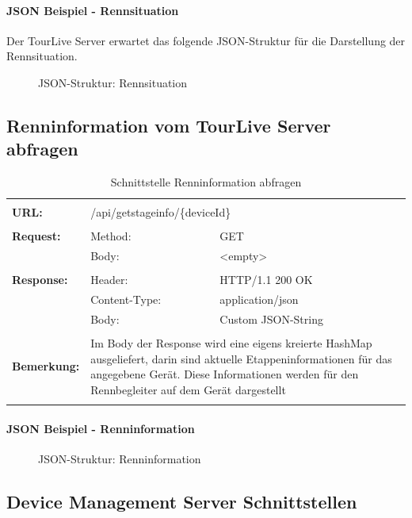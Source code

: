 \paragraph{JSON Beispiel - Rennsituation}
Der TourLive Server erwartet das folgende JSON-Struktur für die Darstellung der Rennsituation.
\begin{figure}[H]
	\centering
	
	\caption{JSON-Struktur: Rennsituation}
\end{figure}

\newpage
\subsection{Renninformation vom TourLive Server abfragen}
\begin{longtable}{ p{2.5cm} || p{3.5cm} p{5.5cm}}
&  \\ [-1.5ex]
	\textbf{URL:} & \multicolumn{2}{p{9cm}}{/api/getstageinfo/\{deviceId\}}  \\ [1ex] \hline & &  \\ [-1.5ex]
	\textbf{Request:} & Method: & GET \\
		& Body: & <empty> \\ [1ex] \hline & &  \\ [-1.5ex]
	\textbf{Response:} & Header: & HTTP/1.1 200 OK \\
		& Content-Type: & application/json \\
		& Body: & Custom JSON-String  \\ [1ex] \hline & &  \\ [-1.5ex]
	\textbf{Bemerkung:} & \multicolumn{2}{p{9cm}}{Im Body der Response wird eine eigens kreierte HashMap ausgeliefert, darin sind aktuelle Etappeninformationen für das angegebene Gerät. Diese Informationen werden für den Rennbegleiter auf dem Gerät dargestellt} \\ [1ex] 
\caption{Schnittstelle Renninformation abfragen}
\end{longtable}

\paragraph{JSON Beispiel - Renninformation}
\begin{figure}[H]
	\centering
	
	\caption{JSON-Struktur: Renninformation}
\end{figure}

\newpage
\subsection{Device Management Server Schnittstellen}

